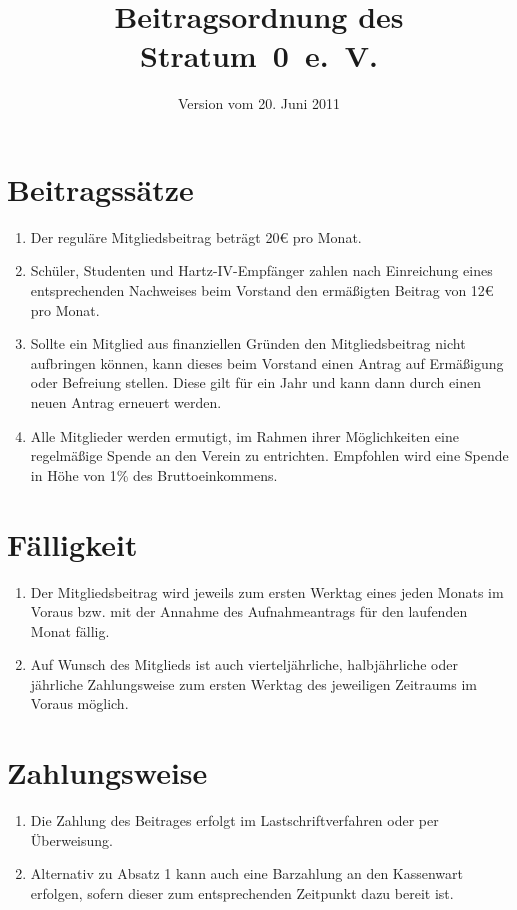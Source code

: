 \documentclass[a4paper,12pt]{scrartcl}
\title{Beitragsordnung des Stratum~0~e.~V.}
\date{Version vom 20. Juni 2011}
\begin{document}
\maketitle

\section{Beitragssätze}
\begin{enumerate}
  \item Der reguläre Mitgliedsbeitrag beträgt 20€ pro Monat.
  \item Schüler, Studenten und Hartz-IV-Empfänger zahlen nach Einreichung eines
    entsprechenden Nachweises beim Vorstand den ermäßigten Beitrag von 12€ pro
    Monat.
  \item Sollte ein Mitglied aus finanziellen Gründen den Mitgliedsbeitrag nicht
    aufbringen können, kann dieses beim Vorstand einen Antrag auf Ermäßigung
    oder Befreiung stellen. Diese gilt für ein Jahr und kann dann durch einen
    neuen Antrag erneuert werden.
  \item Alle Mitglieder werden ermutigt, im Rahmen ihrer Möglichkeiten eine
    regelmäßige Spende an den Verein zu entrichten. Empfohlen wird eine Spende
    in Höhe von 1\% des Bruttoeinkommens.
\end{enumerate}

\section{Fälligkeit}
\begin{enumerate}
  \item Der Mitgliedsbeitrag wird jeweils zum ersten Werktag eines jeden Monats
    im Voraus bzw. mit der Annahme des Aufnahmeantrags für den laufenden Monat
    fällig.
  \item Auf Wunsch des Mitglieds ist auch vierteljährliche, halbjährliche oder
    jährliche Zahlungsweise zum ersten Werktag des jeweiligen Zeitraums im
    Voraus möglich.
\end{enumerate}

\section{Zahlungsweise}
\begin{enumerate}
  \item Die Zahlung des Beitrages erfolgt im Lastschriftverfahren oder per
    Überweisung.
  \item Alternativ zu Absatz 1 kann auch eine Barzahlung an den Kassenwart
    erfolgen, sofern  dieser zum entsprechenden Zeitpunkt dazu bereit ist.
\end{enumerate}
\end{document}
